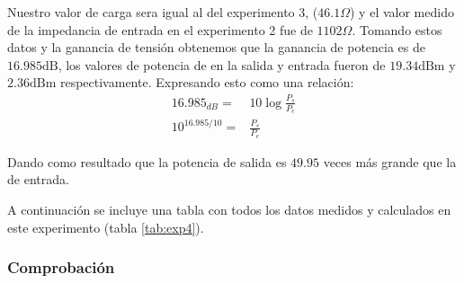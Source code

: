 Nuestro valor de carga sera igual al del experimento 3, ($46.1\Omega$) y el valor medido de la impedancia de entrada en el experimento 2 fue de $1102\Omega$. Tomando estos datos y la ganancia de tensión obtenemos que la ganancia de potencia es de $16.985 \mathrm{dB}$, los valores de potencia de en la salida y entrada fueron de $19.34 \mathrm{dBm}$ y $2.36 \mathrm{dBm}$ respectivamente. Expresando esto como una relación:
\begin{equation}
\begin{aligned}
    16.985_{dB}=&10\log{\frac{P_s}{P_e}}\\
     10^{16.985/10}=&\frac{P_s}{P_e}
\end{aligned}
\end{equation}

Dando como resultado que la potencia de salida es $49.95$ veces más grande que la de entrada.

A continuación se incluye una tabla con todos los datos medidos y calculados en este experimento (tabla \ref{tab:exp4}).

\begin{table}[H]
    \centering
        \def\tablename{Tabla} 
        \caption{Valores obtenidos por mediciones y cálculos}
        \label{tab:exp4}
\end{table}


\subsubsection{Comprobación}

